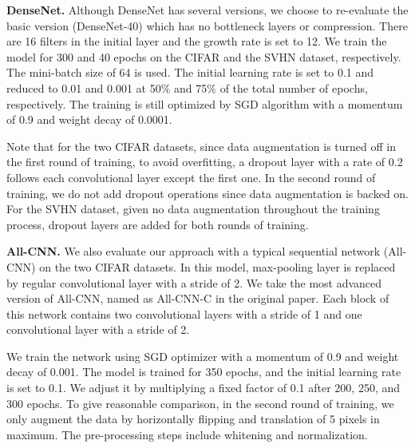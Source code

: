\documentclass[10pt, conference, letterpaper]{IEEEtran}
\begin{document}
\vspace{6pt}
\noindent\textbf{DenseNet.} Although DenseNet has several versions, we choose to re-evaluate the basic version (DenseNet-40) which has no bottleneck layers or compression. There are 16 filters in the initial layer and the growth rate is set to 12. We train the model for 300 and 40 epochs on the CIFAR and the SVHN dataset, respectively. The mini-batch size of 64 is used. The initial learning rate is set to 0.1 and reduced to 0.01 and 0.001 at 50$\%$ and 75$\%$ of the total number of epochs, respectively. The training is still optimized by SGD algorithm with a momentum of 0.9 and weight decay of 0.0001.

Note that for the two CIFAR datasets, since data augmentation is turned off in the first round of training, to avoid overfitting, a dropout layer with a rate of 0.2 follows each convolutional layer except the first one. In the second round of training, we do not add dropout operations since data augmentation is backed on. For the SVHN dataset, given no data augmentation throughout the training process, dropout layers are added for both rounds of training.

\vspace{6pt}
\noindent\textbf{All-CNN.}
We also evaluate our approach with a typical sequential network (All-CNN) \cite{springenberg2014striving} on the two CIFAR datasets. In this model, max-pooling layer is replaced by regular convolutional layer with a stride of 2. We take the most advanced version of All-CNN, named as All-CNN-C in the original paper. Each block of this network contains two convolutional layers with a stride of 1 and one convolutional layer with a stride of 2.

We train the network using SGD optimizer with a momentum of 0.9 and weight decay of 0.001. The model is trained for 350 epochs, and the initial learning rate is set to 0.1. We adjust it by multiplying a fixed factor of 0.1 after 200, 250, and 300 epochs. To give reasonable comparison, in the second round of training, we only augment the data by horizontally flipping and translation of 5 pixels in maximum. The pre-processing steps include whitening and normalization.
\end{document}
